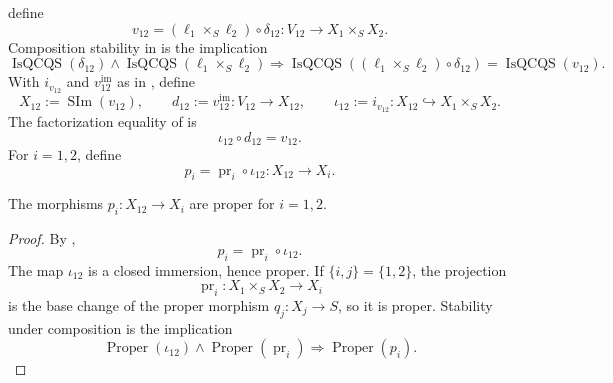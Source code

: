 \begin{definition}
  define
  \[
    v_{12}
      =(\ell_1\times_S\ell_2)\circ\delta_{12}
      \colon V_{12}\to X_1\times_SX_2.
  \]
  Composition stability in
   is the implication
  \[
    \operatorname{IsQCQS}(\delta_{12})\wedge
      \operatorname{IsQCQS}(\ell_1\times_S\ell_2)
      \Longrightarrow
      \operatorname{IsQCQS}
        ((\ell_1\times_S\ell_2)\circ\delta_{12})
      =\operatorname{IsQCQS}(v_{12}).
  \]
  With $i_{v_{12}}$ and $v_{12}^{\mathrm{im}}$ as in
  ,
  define
  \[
    X_{12}:=\operatorname{SIm}(v_{12}),\qquad
    d_{12}:=v_{12}^{\mathrm{im}}\colon V_{12}\to X_{12},\qquad
    \iota_{12}:=i_{v_{12}}\colon X_{12}\hookrightarrow X_1\times_SX_2.
  \]
  The factorization equality of
   is
  \[
    \iota_{12}\circ d_{12}=v_{12}.
  \]
  For $i=1,2$, define
  \[
    p_i=\operatorname{pr}_i\circ\iota_{12}\colon X_{12}\to X_i.
  \]
\end{definition}

\begin{lemma}
  \label{lemma:nagata-comparison-projections-proper}
  \lean{}

  The morphisms $p_i\colon X_{12}\to X_i$ are proper for $i=1,2$.
\end{lemma}

\begin{proof}
  By ,
  \[
    p_i=\operatorname{pr}_i\circ\iota_{12}.
  \]
  The map $\iota_{12}$ is a closed immersion, hence proper.  If
  $\{i,j\}=\{1,2\}$, the projection
  \[
    \operatorname{pr}_i\colon X_1\times_SX_2\to X_i
  \]
  is the base change of the proper morphism $q_j\colon X_j\to S$, so it is
  proper.  Stability under composition is the implication
  \[
    \operatorname{Proper}(\iota_{12})
      \wedge\operatorname{Proper}(\operatorname{pr}_i)
      \Longrightarrow\operatorname{Proper}(p_i).
  \]
\end{proof}

